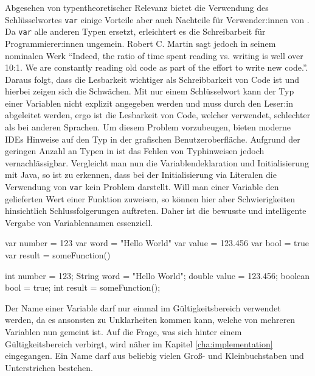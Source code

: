 Abgesehen von typentheoretischer Relevanz bietet die Verwendung des Schlüsselwortes \texttt{var} einige Vorteile aber auch Nachteile für Verwender:innen von \toya. Da \texttt{var} alle anderen Typen ersetzt, erleichtert es die Schreibarbeit für Programmierer:innen ungemein. Robert C. Martin sagt jedoch in seinem nominalen Werk \textcite{martin2009clean} ``Indeed, the ratio of time spent reading vs. writing is well over 10:1. We are constantly reading old code as part of the effort to write new code.''. Daraus folgt, dass die Lesbarkeit wichtiger als Schreibbarkeit von Code ist und hierbei zeigen sich die Schwächen. Mit nur einem Schlüsselwort kann der Typ einer Variablen nicht explizit angegeben werden und muss durch den Leser:in abgeleitet werden, ergo ist die Lesbarkeit von Code, welcher \toya verwendet, schlechter als bei anderen Sprachen. Um diesem Problem vorzubeugen, bieten moderne IDEs Hinweise auf den Typ in der grafischen Benutzeroberfläche. Aufgrund der geringen Anzahl an Typen in \toya ist das Fehlen von Typhinweisen jedoch vernachlässigbar. Vergleicht man nun die Variablendeklaration und Initialisierung mit Java, so ist zu erkennen, dass bei der Initialisierung via Literalen die Verwendung von \texttt{var} kein Problem darstellt. Will man einer Variable den gelieferten Wert einer Funktion zuweisen, so können hier aber Schwierigkeiten hinsichtlich Schlussfolgerungen auftreten. Daher ist die bewusste und intelligente Vergabe von Variablennamen essenziell.

\begin{ToyaCode}[numbers=none, caption={Variablendeklaration in toya}]
var number = 123
var word = "Hello World"
var value = 123.456
var bool = true
var result = someFunction()
\end{ToyaCode}

\begin{JavaCode}[numbers=none,caption={Variablendeklaration in Java (vor Version 10)}]
int number = 123;
String word = "Hello World";
double value = 123.456;
boolean bool = true;
int result = someFunction();
\end{JavaCode}

Der Name einer Variable darf nur einmal im Gültigkeitsbereich verwendet werden, da es ansonsten zu Unklarheiten kommen kann, welche von mehreren Variablen nun gemeint ist. Auf die Frage, was sich hinter einem Gültigkeitsbereich verbirgt, wird näher im Kapitel \ref{cha:implementation} eingegangen. Ein Name darf aus beliebig vielen Groß- und Kleinbuchstaben und Unterstrichen bestehen.

